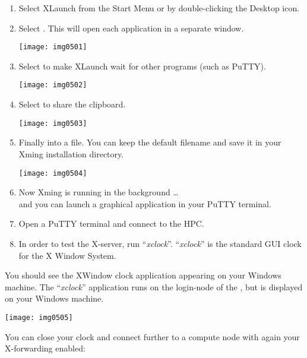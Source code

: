   \begin{enumerate}
  \item Select XLaunch from the Start Menu or by double-clicking the Desktop icon.

  \item  Select . This will open each application in a separate window.

  \texttt{[image: img0501]}


  \item  Select  to make XLaunch wait for other programs (such as PuTTY).

  \texttt{[image: img0502]}


  \item  Select  to share the clipboard.

  \texttt{[image: img0503]}


  \item  Finally  into a file. You can keep the default filename and save it in your Xming installation directory.

  \texttt{[image: img0504]}

  \item  Now Xming is running in the background \ldots\\ and you can launch a graphical application in your PuTTY terminal.
  \item  Open a PuTTY terminal and connect  to the HPC.
  \item  In order to test the X-server, run ``\emph{xclock}''. ``\emph{xclock}'' is the standard GUI clock for the X Window System.
  \end{enumerate}

  \begin{prompt}
  \end{prompt}

  You should see the XWindow clock application appearing on your Windows machine.
  The ``\emph{xclock}'' application runs on the login-node of the \hpc, but is
  displayed on your Windows machine.

  \texttt{[image: img0505]}

  You can close your clock and connect further to a compute node with again your
  X-forwarding enabled:

